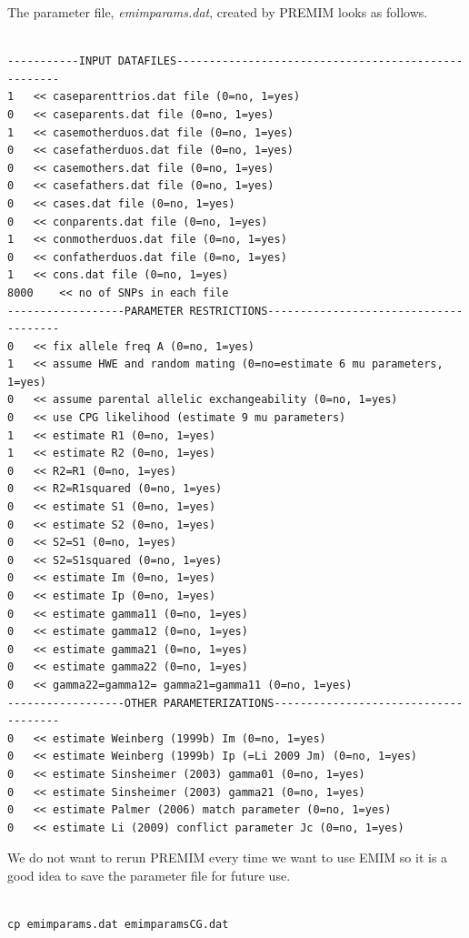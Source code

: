 \documentclass[a4paper,12pt]{article}
\begin{document}
The parameter file, {\it emimparams.dat}, created by PREMIM looks as follows. 
\vspace{0.35cm} \begin{lstlisting}

-----------INPUT DATAFILES----------------------------------------------------
1	<< caseparenttrios.dat file (0=no, 1=yes)
0	<< caseparents.dat file (0=no, 1=yes)
1	<< casemotherduos.dat file (0=no, 1=yes)
0	<< casefatherduos.dat file (0=no, 1=yes)
0	<< casemothers.dat file (0=no, 1=yes)
0	<< casefathers.dat file (0=no, 1=yes)
0	<< cases.dat file (0=no, 1=yes)
0	<< conparents.dat file (0=no, 1=yes)
1	<< conmotherduos.dat file (0=no, 1=yes)
0	<< confatherduos.dat file (0=no, 1=yes)
1	<< cons.dat file (0=no, 1=yes)
8000	<< no of SNPs in each file
------------------PARAMETER RESTRICTIONS--------------------------------------
0	<< fix allele freq A (0=no, 1=yes)
1	<< assume HWE and random mating (0=no=estimate 6 mu parameters, 1=yes)
0	<< assume parental allelic exchangeability (0=no, 1=yes)
0	<< use CPG likelihood (estimate 9 mu parameters)
1	<< estimate R1 (0=no, 1=yes)
1	<< estimate R2 (0=no, 1=yes)
0	<< R2=R1 (0=no, 1=yes)
0	<< R2=R1squared	(0=no, 1=yes)
0	<< estimate S1 (0=no, 1=yes)
0	<< estimate S2 (0=no, 1=yes)
0	<< S2=S1 (0=no, 1=yes)
0	<< S2=S1squared	(0=no, 1=yes)
0	<< estimate Im (0=no, 1=yes)
0	<< estimate Ip (0=no, 1=yes)
0	<< estimate gamma11 (0=no, 1=yes)
0	<< estimate gamma12 (0=no, 1=yes)
0	<< estimate gamma21 (0=no, 1=yes)
0	<< estimate gamma22 (0=no, 1=yes)
0	<< gamma22=gamma12= gamma21=gamma11 (0=no, 1=yes)
------------------OTHER PARAMETERIZATIONS-------------------------------------
0	<< estimate Weinberg (1999b) Im (0=no, 1=yes)
0	<< estimate Weinberg (1999b) Ip (=Li 2009 Jm) (0=no, 1=yes)
0	<< estimate Sinsheimer (2003) gamma01 (0=no, 1=yes)
0	<< estimate Sinsheimer (2003) gamma21 (0=no, 1=yes)
0	<< estimate Palmer (2006) match parameter (0=no, 1=yes)
0	<< estimate Li (2009) conflict parameter Jc (0=no, 1=yes)

\end{lstlisting} \vspace{0.35cm}
We do not want to rerun PREMIM every time we want to use EMIM so it is a good idea to save the parameter file for future use. 
\vspace{0.35cm} \begin{lstlisting}

cp emimparams.dat emimparamsCG.dat

\end{lstlisting} \vspace{0.35cm}
\end{document}
